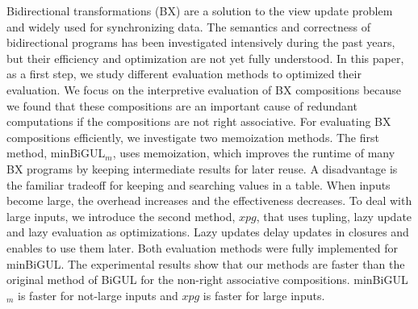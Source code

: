  Bidirectional transformations (BX) are a solution to the view update problem and widely used for synchronizing data. The semantics and correctness of bidirectional programs has been investigated intensively during the past years, but their efficiency and optimization are not yet fully understood. In this paper, as a first step, we study different evaluation methods to optimized their evaluation. We focus on the interpretive evaluation of BX compositions because we found that these compositions are an important cause of redundant computations if the compositions are not right associative. 
 For evaluating BX compositions efficiently, we investigate two memoization methods. The first method, minBiGUL$_m$, uses memoization, which improves the runtime of many BX programs by keeping intermediate results for later reuse. A disadvantage is the familiar tradeoff for keeping and searching values in a table.
  When inputs become large, the overhead increases and the effectiveness decreases. To deal with large inputs, we introduce the second method, $xpg$, that uses tupling, lazy update and lazy evaluation as optimizations. Lazy updates delay updates in closures and enables to use them later.
  Both evaluation methods were fully implemented for minBiGUL. The experimental results show that our methods are faster than the original method of BiGUL for the non-right associative compositions. minBiGUL$_m$ is faster for not-large inputs and $xpg$ is faster for large inputs.
